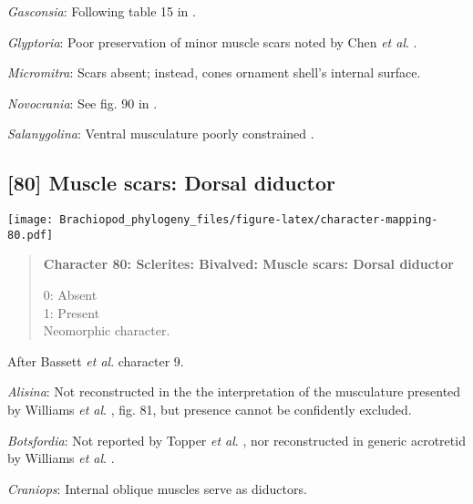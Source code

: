 \documentclass[openany]{book}
\theoremstyle{definition}
\theoremstyle{definition}
\theoremstyle{definition}
\theoremstyle{remark}
\begin{document}
\hypertarget{Gasconsia-coding-79}{}
\emph{Gasconsia}: Following table 15 in
\citet{Williams2000LinguliformeaCraniiformea}.

\hypertarget{Glyptoria-coding-79}{}
\emph{Glyptoria}: Poor preservation of minor muscle scars noted by Chen
\emph{et al}. \citeyearpar{Chen2007Reinterpretationof}.

\hypertarget{Micromitra-coding-79}{}
\emph{Micromitra}: Scars absent; instead, cones ornament shell's
internal surface.

\hypertarget{Novocrania-coding-79}{}
\emph{Novocrania}: See fig. 90 in
\citet{Williams2000LinguliformeaCraniiformea}.

\hypertarget{Salanygolina-coding-79}{}
\emph{Salanygolina}: Ventral musculature poorly constrained
\citep{Williams2000LinguliformeaCraniiformea, Popov2009Earlyontogeny}.

\subsection*{{[}80{]} Muscle scars: Dorsal
diductor}\label{muscle-scars-dorsal-diductor}

\texttt{[image: Brachiopod\_phylogeny\_files/figure-latex/character-mapping-80.pdf]}

\begin{quote}
\textbf{Character 80: Sclerites: Bivalved: Muscle scars: Dorsal
diductor}

0: Absent\\
1: Present\\
Neomorphic character.
\end{quote}

After Bassett \emph{et al}.
\citeyearpar{Bassett2001Functionalmorphology} character 9.

\hypertarget{Alisina-coding-80}{}
\emph{Alisina}: Not reconstructed in the the interpretation of the
musculature presented by Williams \emph{et al}.
\citeyearpar{Williams2000LinguliformeaCraniiformea}, fig. 81, but
presence cannot be confidently excluded.

\hypertarget{Botsfordia-coding-80}{}
\emph{Botsfordia}: Not reported by Topper \emph{et al}.
\citeyearpar{Topper2013Reappraisalof}, nor reconstructed in generic
acrotretid by Williams \emph{et al}.
\citeyearpar{Williams2000LinguliformeaCraniiformea}.

\hypertarget{Craniops-coding-80}{}
\emph{Craniops}: Internal oblique muscles serve as diductors.
\end{document}
